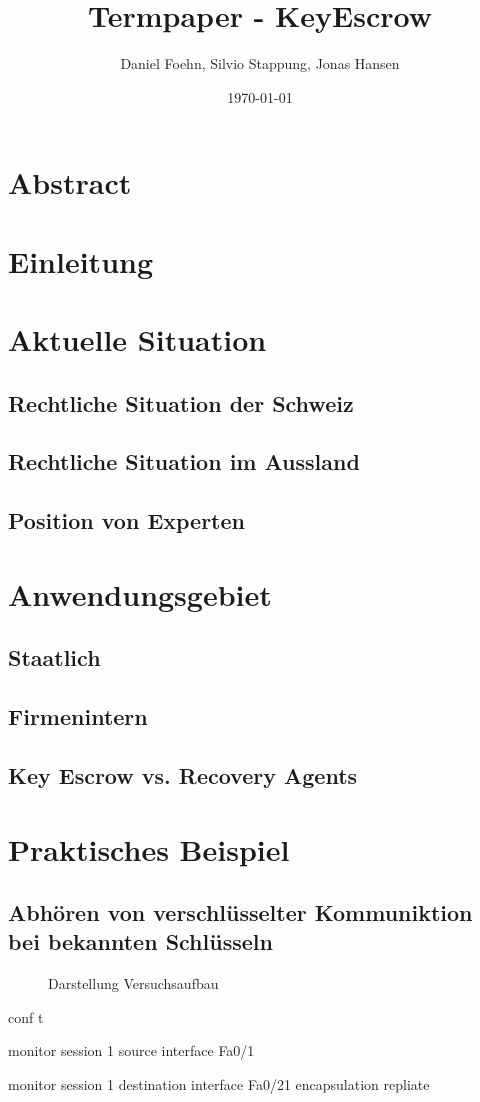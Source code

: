 \documentclass[a4paper, 10pt, fleqn]{article}
\title{Termpaper - KeyEscrow}
\author{Daniel Foehn, Silvio Stappung, Jonas Hansen}
\date{\today} %
\newcommand{\shadebox}[1]{\par\noindent\colorbox{shadecolor}
{\parbox{\dimexpr\textwidth-2\fboxsep\relax}{#1}}}
\begin{document}
\maketitle
\tableofcontents
\listoffigures
\listoftables
\clearpage
\section{Abstract}
\clearpage
\section{Einleitung}
\clearpage
\section{Aktuelle Situation}
	\subsection{Rechtliche Situation der Schweiz}
	\subsection{Rechtliche Situation im Aussland}
	\subsection{Position von Experten}
\clearpage
\section{Anwendungsgebiet}
	\subsection{Staatlich}
	\subsection{Firmenintern}
	\subsection{Key Escrow vs. Recovery Agents}
\clearpage
\section{Praktisches Beispiel}
	\subsection{Abhören von verschlüsselter Kommuniktion bei bekannten Schlüsseln}
	\begin{figure}[H]
		\centering
		\caption{Darstellung Versuchsaufbau}
		\label{fig:versuchsaufbau}
	\end{figure}
	\shadebox{conf t}
	\shadebox{monitor session 1 source interface Fa0/1}
	\shadebox{monitor session 1 destination interface Fa0/21 encapsulation repliate}
\end{document}
